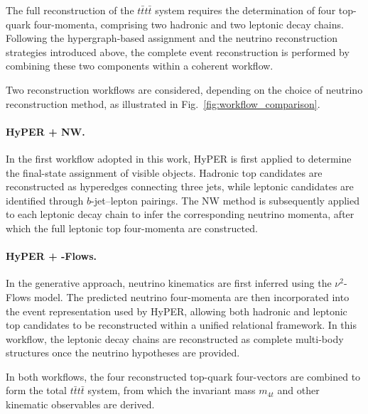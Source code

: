The full reconstruction of the $t\bar{t}t\bar{t}$ system requires the determination of four top-quark four-momenta, comprising two hadronic and two leptonic decay chains. 
Following the hypergraph-based assignment and the neutrino reconstruction strategies introduced above, the complete event reconstruction is performed by combining these two components within a coherent workflow.

Two reconstruction workflows are considered, depending on the choice of neutrino reconstruction method, as illustrated in Fig.~\ref{fig:workflow_comparison}.

\paragraph{HyPER + NW.}

In the first workflow adopted in this work, HyPER is first applied to determine the final-state assignment of visible objects. 
Hadronic top candidates are reconstructed as hyperedges connecting three jets, while leptonic candidates are identified through $b$-jet–lepton pairings. 
The NW method is subsequently applied to each leptonic decay chain to infer the corresponding neutrino momenta, after which the full leptonic top four-momenta are constructed.

\paragraph{HyPER + \nuTwoHead{}-Flows.}

In the generative approach, neutrino kinematics are first inferred using the $\nu^2$-Flows model. 
The predicted neutrino four-momenta are then incorporated into the event representation used by HyPER, allowing both hadronic and leptonic top candidates to be reconstructed within a unified relational framework. 
In this workflow, the leptonic decay chains are reconstructed as complete multi-body structures once the neutrino hypotheses are provided.

In both workflows, the four reconstructed top-quark four-vectors are combined to form the total $t\bar{t}t\bar{t}$ system, from which the invariant mass $m_{4t}$ and other kinematic observables are derived.

